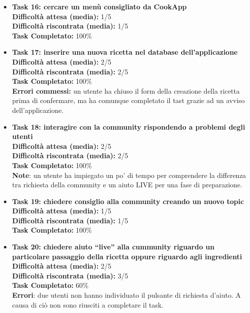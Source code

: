 \begin{itemize}
\item
\textbf{Task 16: cercare un menù consigliato da CookApp}\\
\textbf{Difficoltà attesa (media):} 1/5\\
\textbf{Difficoltà riscontrata (media):} 1/5\\
\textbf{Task Completato:} 100\%\\

\item
\textbf{Task 17: inserire una nuova ricetta nel database
dell'applicazione}\\
\textbf{Difficoltà attesa (media):} 2/5\\
\textbf{Difficoltà riscontrata (media):} 2/5\\
\textbf{Task Completato:} 100\%\\
\textbf{Errori commessi:} un utente ha chiuso il form della creazione
della ricetta prima di confermare, ma ha comunque completato il tast
grazie ad un avviso dell'applicazione.\\

\item
\textbf{Task 18: interagire con la community rispondendo a problemi
degli utenti}\\
\textbf{Difficoltà attesa (media):} 2/5\\
\textbf{Difficoltà riscontrata (media):} 2/5\\
\textbf{Task Completato:} 100\%\\
\textbf{Note}: un utente ha impiegato un po' di tempo per comprendere la
differenza tra richiesta della community e un aiuto LIVE per una fase di
preparazione.

\item
\textbf{Task 19: chiedere consiglio alla community creando un nuovo
topic}\\
\textbf{Difficoltà attesa (media):} 1/5\\
\textbf{Difficoltà riscontrata (media):} 1/5\\
\textbf{Task Completato:} 100\%\\

\item
\textbf{Task 20: chiedere aiuto ``live'' alla cummunity riguardo un
particolare passaggio della ricetta oppure riguardo agli ingredienti}\\
\textbf{Difficoltà attesa (media):} 2/5\\
\textbf{Difficoltà riscontrata (media):} 3/5\\
\textbf{Task Completato:} 60\%\\
\textbf{Errori}: due utenti non hanno individuato il pulsante di
richiesta d'aiuto. A causa di ciò non sono riusciti a completare il
task.


\end{itemize}
